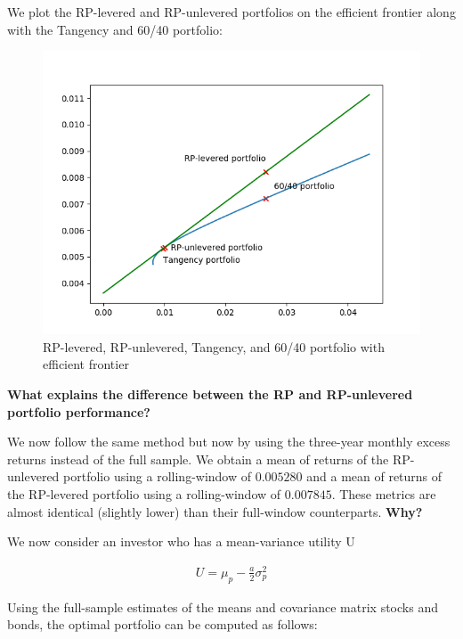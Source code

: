 \documentclass[10pt]{article}
\newenvironment{exercise}[2][Exercise]{\begin{trivlist}
  \item[\hskip \labelsep {\bfseries #1}\hskip \labelsep {\bfseries #2.}]}{\end{trivlist}}
\begin{document}
\begin{exercise}{3}
	We plot the RP-levered and RP-unlevered portfolios on the efficient frontier along with the Tangency and 60/40 portfolio:
	
	\begin{figure}[H]
	
		\centering
		\includegraphics[scale=0.8]{figures/ex3.png}	
		\caption{RP-levered, RP-unlevered, Tangency, and 60/40 portfolio with efficient frontier}	
		\label{fig:ex3}
	
	\end{figure} 
	
	\textbf{What explains the difference between the RP and RP-unlevered portfolio performance?}
	
	\bigbreak	
	
	We now follow the same method but now by using the three-year monthly excess returns instead of the full sample. We obtain a mean of returns of the RP-unlevered portfolio using a rolling-window of $0.005280$ and a mean of returns of the RP-levered portfolio using a rolling-window of $0.007845$. These metrics are almost identical (slightly lower) than their full-window counterparts. \textbf{Why?}
	
	\bigbreak
	
	We now consider an investor who has a mean-variance utility U
	
	\begin{align*}
		U = \mu_{p} - \frac{a}{2}\sigma^{2}_{p}
	\end{align*}
	
	Using the full-sample estimates of the means and covariance matrix stocks and bonds, the optimal portfolio can be computed as follows:
	

\end{exercise}
\end{document}
